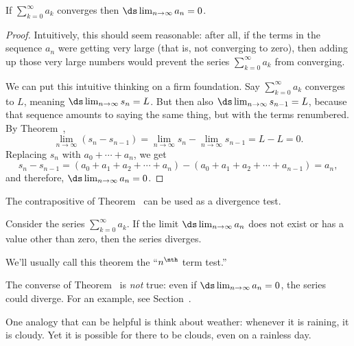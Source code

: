 \begin{theorem}\label{thm:divergence-test} If $\sum_{k=0}^\infty a_k$
  converges then $\ds\lim_{n\to\infty}a_n=0$.
\end{theorem}
\begin{proof} Intuitively, this should seem reasonable: after all, if
  the terms in the sequence $a_n$ were getting very large (that is,
  not converging to zero), then adding up those very large numbers
  would prevent the series $\sum_{k=0}^\infty a_k$ from converging.

  We can put this intuitive thinking on a firm foundation.  Say
  $\sum_{k=0}^\infty a_k$ converges to $L$, meaning
  $\ds\lim_{n\to\infty}s_n=L$.  But then also
  $\ds\lim_{n\to\infty}s_{n-1}=L$, because that sequence amounts to
  saying the same thing, but with the terms renumbered.  By
  Theorem~,
$$
  \lim_{n\to\infty} (s_{n}-s_{n-1})=
  \lim_{n\to\infty} s_{n}-\lim_{n\to\infty}s_{n-1}=L-L=0.
$$
Replacing $s_n$ with $a_0+\cdots+a_n$, we get
$$
  s_{n}-s_{n-1}=(a_0+a_1+a_2+\cdots+a_n)-(a_0+a_1+a_2+\cdots+a_{n-1})
  =a_n,
$$
and therefore, $\ds\lim_{n\to\infty}a_n=0$.
\end{proof}

The contrapositive of Theorem~ can be used
as a divergence test.
\begin{theorem}\label{thm:nth-term-test}
Consider the series $\sum_{k=0}^\infty
a_k$. If the limit $\ds\lim_{n\to\infty}a_n$ does not exist or has a value
other than zero, then the series diverges.
\end{theorem}
We'll usually call this theorem the ``$n^{\nth}$ term test.''

\begin{warning}
  The converse of Theorem~ is {\em not\/}
  true: even if $\ds\lim_{n\to\infty}a_n=0$, the series could diverge.
  For an example, see Section~.
\end{warning}
  One analogy that can be helpful is think
about weather: whenever it is raining, it is cloudy.  Yet it is
possible for there to be clouds, even on a rainless day.  

